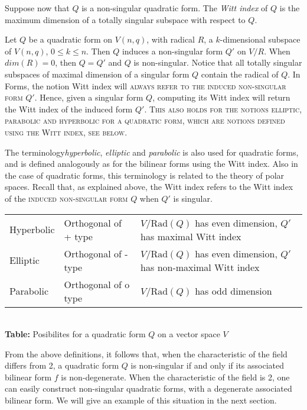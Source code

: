 \documentclass[a4paper,11pt]{report}
\begin{document}
{{Suppose now that $Q$ is a non-singular quadratic form. The \emph{Witt index} of $Q$ is the maximum dimension of a totally singular subspace with respect to $Q$. 

 Let $Q$ be a quadratic form on $V(n,q)$, with radical $R$, a $k$-dimensional subspace of $V(n,q)$, $0 \leq k \leq n$. Then $Q$ induces a non-singular form $Q'$ on $V/R$. When $dim(R)=0$, then $Q=Q'$ and $Q$ is non-singular. Notice that all totally singular subspaces of maximal
dimension of a singular form $Q$ contain the radical of $Q$. In \textsf{Forms}, the notion Witt index will \textsc{always refer to the induced non-singular form} $Q'$. Hence, given a singular form $Q$, computing its Witt index will return the Witt index of the induced form $Q'$. \textsc{This also holds for the notions elliptic, parabolic and hyperbolic for a
quadratic form, which are notions defined using the Witt index, see below}. 

 The terminology\emph{hyperbolic}, \emph{elliptic} and \emph{parabolic} is also used for quadratic forms, and is defined analogously as for the
bilinear forms using the Witt index. Also in the case of quadratic forms, this
terminology is related to the theory of polar spaces. Recall that, as
explained above, the Witt index refers to the Witt index of the \textsc{induced non-singular form} $Q$ when $Q'$ is singular. \begin{center}
\begin{tabular}{l|l|l}\hline
Hyperbolic&
Orthogonal of + type&
$V/\mathrm{Rad}(Q)$ has even dimension, $Q'$ has maximal Witt index\\
Elliptic&
Orthogonal of - type&
$V/\mathrm{Rad}(Q)$ has even dimension, $Q'$ has non-maximal Witt index\\
Parabolic&
Orthogonal of o type&
$V/\mathrm{Rad}(Q)$ has odd dimension\\
\hline
\end{tabular}\\[2mm]
\textbf{Table: }Posibilites for a quadratic form $Q$ on a vector space $V$\end{center}

 From the above definitions, it follows that, when the characteristic of the
field differs from 2, a quadratic form $Q$ is non-singular if and only if its associated bilinear form $f$ is non-degenerate. When the characteristic of the field is 2, one can easily
construct non-singular quadratic forms, with a degenerate associated bilinear
form. We will give an example of this situation in the next section. 
}}
\end{document}
